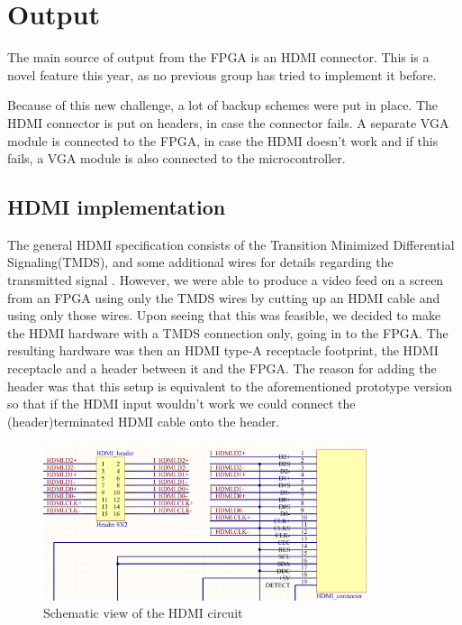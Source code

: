 \documentclass[../main/report.tex]{subfiles}
\begin{document}
\section{Output}
The main source of output from the FPGA is an HDMI connector.
This is a novel feature this year, as no previous group has tried to implement it before.

Because of this new challenge, a lot of backup schemes were put in place.
The HDMI connector is put on headers, in case the connector fails.
A separate VGA module is connected to the FPGA, in case the HDMI doesn't work and if this fails, a VGA module is also connected to the microcontroller.

\subsection{HDMI implementation}

The general HDMI specification consists of the Transition Minimized Differential Signaling(TMDS), and some additional wires for details regarding the transmitted signal \cite{hdmi-pinout}.
However, we were able to produce a video feed on a screen from an FPGA using only the TMDS wires by cutting up an HDMI cable and using only those wires.
Upon seeing that this was feasible, we decided to make the HDMI hardware with a TMDS connection only, going in to the FPGA. The resulting hardware was then an HDMI type-A receptacle footprint, the HDMI receptacle and a header between it and the FPGA.
The reason for adding the header was that this setup is equivalent to the aforementioned prototype version so that if the HDMI input wouldn't work we could connect the (header)terminated HDMI cable onto the header.

\begin{figure}[H]
	\centering
	\includegraphics[width=0.85\textwidth]{../pcb/assets/HDMI-schematic.png}
	\caption{Schematic view of the HDMI circuit}
	\label{fig: HDMI schematic}
\end{figure}
\end{document}
